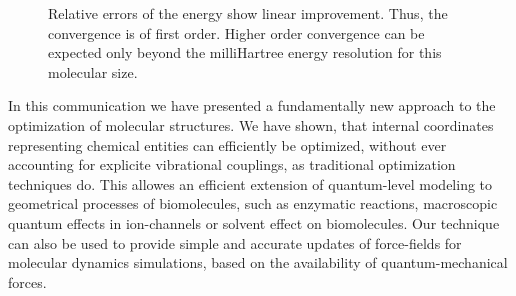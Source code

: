 \documentclass[prl,aps,twocolumn,showpacs,twocolumngrid,superbib]{revtex4}
\begin{document}
\begin{figure}[h]
\caption{
\small  
Relative errors of the energy show linear improvement.
Thus, the convergence is of first order. Higher order
convergence can be expected only beyond the milliHartree
energy resolution for this molecular size.
\label{order-of-conv}
}
\end{figure}
In this communication we have presented a fundamentally new approach
to the optimization of molecular structures.
We have shown, that internal coordinates representing chemical 
entities can efficiently be optimized, without
ever accounting for explicite vibrational couplings, as traditional
optimization techniques do. This allowes an efficient
extension of quantum-level modeling to geometrical processes
of biomolecules, such as enzymatic reactions, macroscopic quantum 
effects in ion-channels or solvent effect on biomolecules.
Our technique can also be used
to provide simple and accurate updates of force-fields
for molecular dynamics simulations, based on the availability of
quantum-mechanical forces.
%
%

\end{document}
